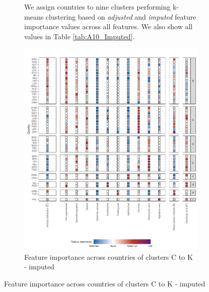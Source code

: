 \begin{figure}[ht!]
\begin{subfigure}[b]{\textwidth}
\begin{subcaption2}
    We assign countries to nine clusters performing k-means clustering based on \textit{adjusted} and \textit{imputed} feature importance values across all features. We also show all values in Table \ref{tab:A10_Imputed}.
    \end{subcaption2}
    \end{subfigure}
    
\end{figure}
\clearpage

\clearpage
\begin{figure}[ht!]\ContinuedFloat
    \centering
    \begin{subfigure}[b]{\textwidth}
    \centering
    \includegraphics{Figure 4/Figure_4_Corrected_Imputed_2.pdf}
    \caption{Feature importance across countries of clusters C to K - imputed}\label{fig:fig_4_2_imputed}
    \begin{subcaption2}

\end{subcaption2}
\end{subfigure}
\end{figure}
